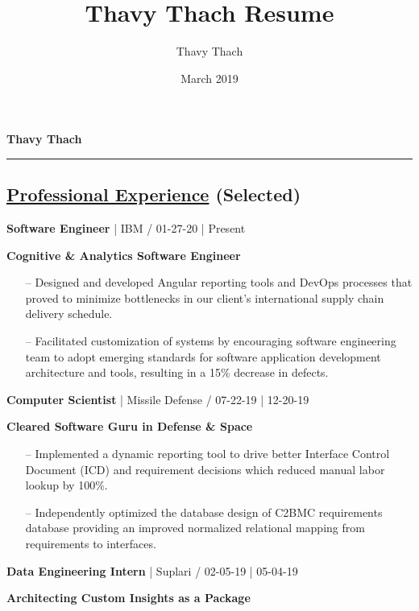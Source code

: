 \documentclass{article}
\title{Thavy Thach Resume}
\author{Thavy Thach}
\date{March 2019}
\begin{document}
\textbf{{\huge Thavy Thach}}
\newline
\noindent\rule{19cm}{0.1pt}

\begin{multicols}{2}

\section*{\underline{Professional Experience} {\small(Selected)}}

{\footnotesize{\textbf{Software Engineer} | IBM / 01-27-20 | Present}}
{\footnotesize{
\newline\textbf{Cognitive \& Analytics Software Engineer}
\begin{itemize}
	\item[--] Designed and developed Angular reporting tools and DevOps processes that proved to minimize bottlenecks in our client's international supply chain delivery schedule.
	\item[--] Facilitated customization of systems by encouraging software engineering team to adopt emerging standards for software application development architecture and tools, resulting in a 15\% decrease in defects.
\end{itemize}
}}
\hfill \break
{\footnotesize{\textbf{Computer Scientist} | Missile Defense / 07-22-19 | 12-20-19}}
{\footnotesize{
\newline\textbf{Cleared Software Guru in Defense \& Space}
\begin{itemize}
	\item[--] Implemented a dynamic reporting tool to drive better Interface Control Document (ICD) and requirement decisions which reduced manual labor lookup by 100\%.
	\item[--] Independently optimized the database design of C2BMC requirements database providing an improved normalized relational mapping from requirements to interfaces.
\end{itemize}
}}
\hfill \break
{\footnotesize{\textbf{Data Engineering Intern} | Suplari / 02-05-19 | 05-04-19}}
{\footnotesize{
\newline\textbf{Architecting Custom Insights as a Package}
\begin{itemize}

\end{itemize}}}
\end{multicols}
\end{document}

